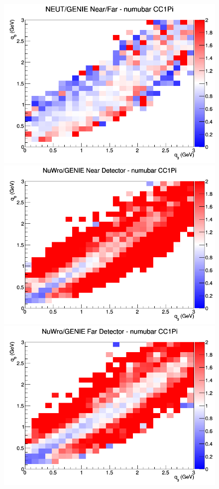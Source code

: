 \documentclass[12pt]{article}
\begin{document}
\begin{figure}[h]
\endminipage
{}
\includegraphics[width=\linewidth]{eff_q0_q3/FGT/ratios/CC1Pi_NEUT_GENIE_numubar_NF_q3_q0.png}
\endminipage
\newline
{}
\includegraphics[width=\linewidth]{eff_q0_q3/FGT/ratios/CC1Pi_NuWro_GENIE_numubar_near_q3_q0.png}
\endminipage
{}
\includegraphics[width=\linewidth]{eff_q0_q3/FGT/ratios/CC1Pi_NuWro_GENIE_numubar_far_q3_q0.png}

\end{figure}
\end{document}

